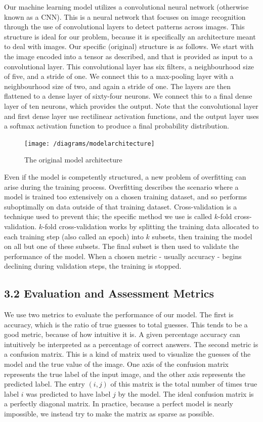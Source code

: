 \documentclass{article}
\begin{document}
Our machine learning model utilizes a convolutional neural network (otherwise known as a CNN). This is a neural network that focuses on image recognition through the use of convolutional layers to detect patterns across images. This structure is ideal for our problem, because it is specifically an architecture meant to deal with images. Our specific (original) structure is as follows. We start with the image encoded into a tensor as described, and that is provided as input to a convolutional layer. This convolutional layer has six filters, a neighbourhood size of five, and a stride of one. We connect this to a max-pooling layer with a neighbourhood size of two, and again a stride of one. The layers are then flattened to a dense layer of sixty-four neurons. We connect this to a final dense layer of ten neurons, which provides the output. Note that the convolutional layer and first dense layer use rectilinear activation functions, and the output layer uses a softmax activation function to produce a final probability distribution.
\begin{figure}[H]
\texttt{[image: /diagrams/modelarchitecture]}
\caption{The original model architecture}
\end{figure}

Even if the model is competently structured, a new problem of overfitting can arise during the training process. Overfitting describes the scenario where a model is trained too extensively on a chosen training dataset, and so performs suboptimally on data outside of that training dataset. Cross-validation is a technique used to prevent this; the specific method we use is called $k$-fold cross-validation. $k$-fold cross-validation works by splitting the training data allocated to each training step (also called an epoch) into $k$ subsets, then training the model on all but one of these subsets. The final subset is then used to validate the performance of the model. When a chosen metric - usually accuracy - begins declining during validation steps, the training is stopped.

\subsection*{3.2 Evaluation and Assessment Metrics}
We use two metrics to evaluate the performance of our model. The first is accuracy, which is the ratio of true guesses to total guesses. This tends to be a good metric, because of how intuitive it is. A given percentage accuracy can intuitively be interpreted as a percentage of correct answers. The second metric is a confusion matrix. This is a kind of matrix used to visualize the guesses of the model and the true value of the image. One axis of the confusion matrix represents the true label of  the input image, and the other axis represents the predicted label. The entry $(i, j)$ of this matrix is the total number of times true label $i$ was predicted to have label $j$ by the model. The ideal confusion matrix is a perfectly diagonal matrix. In practice, because a perfect model is nearly impossible, we instead try to make the matrix as sparse as possible.
\end{document}
